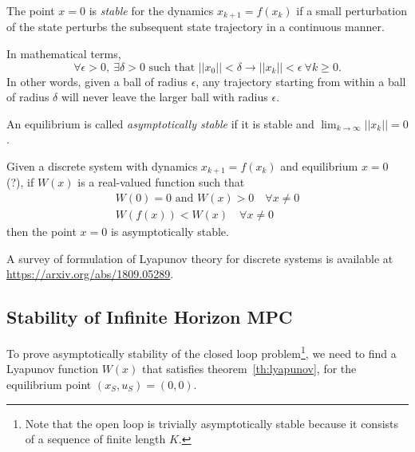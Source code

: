 \begin{definition}
  The point $x=0$ is \emph{stable} for the dynamics $x_{k+1} = f(x_k)$ if a small perturbation of the state perturbs the subsequent state trajectory in a continuous manner.

  In mathematical terms,
  \begin{equation}
    \label{eq:lyapunov-stability-stable-equilibrium}
    \forall \epsilon > 0,\ \exists \delta > 0 \text{ such that } ||x_0|| < \delta \rightarrow ||x_k|| < \epsilon\ \forall k \ge 0.
  \end{equation}
  In other words, given a ball of radius $\epsilon$, any trajectory starting from within a ball of radius $\delta$ will never leave the larger ball with radius $\epsilon$.

  An equilibrium is called \emph{asymptotically stable} if it is stable and $\lim_{k\rightarrow \infty} ||x_k||=0$.
\end{definition}

\begin{theorem}
  \label{th:lyapunov}
  Given a discrete system with dynamics $x_{k+1} = f(x_k)$ and equilibrium $x=0$ (?), if $W(x)$ is a real-valued function such that
  \begin{equation*}
    \begin{aligned}
      W(0)=0 \textrm{ and } W(x)>0\quad \forall x\neq 0 \\
      W(f(x)) < W(x)\quad \forall x\neq 0
    \end{aligned}
  \end{equation*}
  then the point $x=0$ is asymptotically stable.
\end{theorem}
A survey of formulation of Lyapunov theory for discrete systems is available at \url{https://arxiv.org/abs/1809.05289}.

\subsection{Stability of Infinite Horizon MPC}
\label{sec:stability-infinite-horizon-MPC}

To prove asymptotically stability of the closed loop problem\footnote{Note that the open loop is trivially asymptotically stable because it consists of a sequence of finite length $K$.}, we need to find a Lyapunov function $W(x)$ that satisfies theorem~\ref{th:lyapunov}, for the equilibrium point $(x_S,u_S)=(0,0)$.


